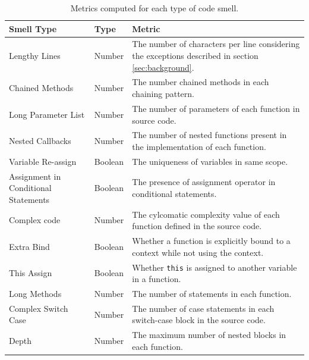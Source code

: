 \begin{table}[!htbp]
\scriptsize
\centering
\caption{Metrics computed for each type of code smell.}
\label{smellmetric}
\begin{tabular}{l|l|l}
\hline
Smell Type                           & Type    & Metric                                                                                                  \\ \hline
Lengthy Lines                        & Number  & The number of characters per line considering the exceptions described in section \ref{sec:background}. \\ \hline
Chained Methods                      & Number  & The number chained methods in each chaining pattern.                                               \\ \hline
Long Parameter List                  & Number  & The number of parameters of each function in source code.                                               \\ \hline
Nested Callbacks                     & Number  & The number of nested functions present in the implementation of each function.                          \\ \hline
Variable Re-assign                   & Boolean & The uniqueness of variables in same scope.                                                              \\ \hline
Assignment in Conditional Statements & Boolean & The presence of assignment operator in conditional statements.                                          \\ \hline
Complex code                         & Number  & The cylcomatic complexity value of each function defined in the source code.                            \\ \hline
Extra Bind                           & Boolean & Whether a function is explicitly bound to a context while not using the context.                        \\ \hline
This Assign                          & Boolean & Whether \texttt{this} is assigned to another variable in a function.                                    \\ \hline
Long Methods                         & Number  & The number of statements in each function.                                                              \\ \hline
Complex Switch Case                  & Number  & The number of case statements in each switch-case block in the source code.                             \\ \hline
Depth                                & Number  & The maximum number of nested blocks in each function.                                                   \\ \hline
\end{tabular}
\vspace{-15pt}
\end{table}

